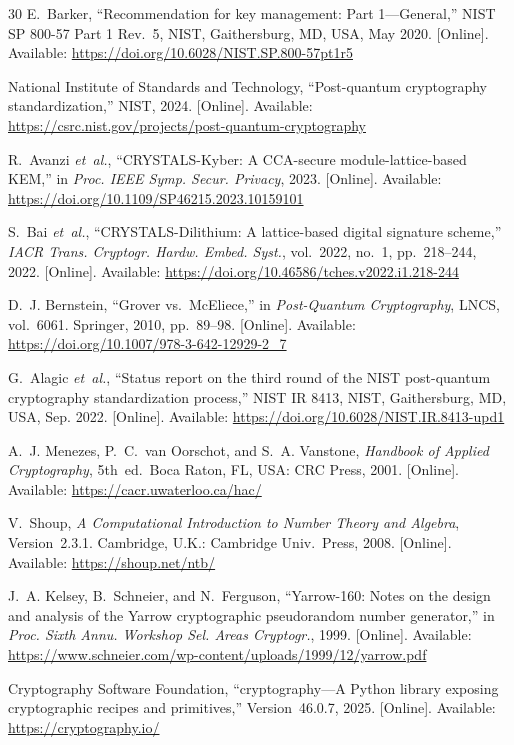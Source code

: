 \documentclass[journal]{IEEEtran}
\begin{document}
\begin{thebibliography}{30}
E.~Barker, ``Recommendation for key management: Part 1---General,'' NIST SP 800-57 Part 1 Rev.~5, NIST, Gaithersburg, MD, USA, May 2020. [Online]. Available: \url{https://doi.org/10.6028/NIST.SP.800-57pt1r5}

National Institute of Standards and Technology, ``Post-quantum cryptography standardization,'' NIST, 2024. [Online]. Available: \url{https://csrc.nist.gov/projects/post-quantum-cryptography}

R.~Avanzi \textit{et~al.}, ``CRYSTALS-Kyber: A CCA-secure module-lattice-based KEM,'' in \textit{Proc. IEEE Symp. Secur. Privacy}, 2023. [Online]. Available: \url{https://doi.org/10.1109/SP46215.2023.10159101}

S.~Bai \textit{et~al.}, ``CRYSTALS-Dilithium: A lattice-based digital signature scheme,'' \textit{IACR Trans. Cryptogr. Hardw. Embed. Syst.}, vol.~2022, no.~1, pp.~218--244, 2022. [Online]. Available: \url{https://doi.org/10.46586/tches.v2022.i1.218-244}

D.~J. Bernstein, ``Grover vs.\ McEliece,'' in \textit{Post-Quantum Cryptography}, LNCS, vol.~6061. Springer, 2010, pp.~89--98. [Online]. Available: \url{https://doi.org/10.1007/978-3-642-12929-2_7}

G.~Alagic \textit{et~al.}, ``Status report on the third round of the NIST post-quantum cryptography standardization process,'' NIST IR 8413, NIST, Gaithersburg, MD, USA, Sep. 2022. [Online]. Available: \url{https://doi.org/10.6028/NIST.IR.8413-upd1}

A.~J. Menezes, P.~C.~van Oorschot, and S.~A. Vanstone, \textit{Handbook of Applied Cryptography}, 5th~ed.\ Boca Raton, FL, USA: CRC Press, 2001. [Online]. Available: \url{https://cacr.uwaterloo.ca/hac/}

V.~Shoup, \textit{A Computational Introduction to Number Theory and Algebra}, Version~2.3.1. Cambridge, U.K.: Cambridge Univ.\ Press, 2008. [Online]. Available: \url{https://shoup.net/ntb/}

J.~A. Kelsey, B.~Schneier, and N.~Ferguson, ``Yarrow-160: Notes on the design and analysis of the Yarrow cryptographic pseudorandom number generator,'' in \textit{Proc. Sixth Annu. Workshop Sel. Areas Cryptogr.}, 1999. [Online]. Available: \url{https://www.schneier.com/wp-content/uploads/1999/12/yarrow.pdf}

Cryptography Software Foundation, ``cryptography---A Python library exposing cryptographic recipes and primitives,'' Version~46.0.7, 2025. [Online]. Available: \url{https://cryptography.io/}


\end{thebibliography}
\end{document}
